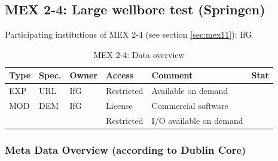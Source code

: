 \subsection{MEX 2-4: Large wellbore test (Springen)}

Participating institutions of MEX 2-4 (see section \ref{sec:mex11}): IfG

\begin{table}[ht!]
\caption{MEX 2-4: Data overview}
\label{tab:dms-mex24-overview}
\small
\begin{tabular}{l|l|l|l|L{4.7cm}|l}
\hline
{}
Type & Spec. & Owner & Access     & Comment                       & Stat \\ 
\hline 
EXP  & URL   & IfG   & Restricted & Available on demand           &  \\
\hline \hline
MOD  & DEM   & IfG   & License    & Commercial software           &  \\
     &       &       & Restricted & I/O available on demand       &  \\
\hline
\end{tabular}
\end{table}
\normalsize

\subsubsection*{Meta Data Overview (according to Dublin Core)}

